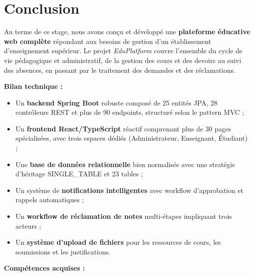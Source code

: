 \chapter*{Conclusion}

Au terme de ce stage, nous avons conçu et développé une \textbf{plateforme éducative web complète} répondant aux besoins de gestion d'un établissement d'enseignement supérieur. Le projet \textit{EduPlatform} couvre l'ensemble du cycle de vie pédagogique et administratif, de la gestion des cours et des devoirs au suivi des absences, en passant par le traitement des demandes et des réclamations.

\vspace{0.5cm}

\textbf{Bilan technique :}

\begin{itemize}[noitemsep]
    \item Un \textbf{backend Spring Boot} robuste composé de 25 entités JPA, 28 contrôleurs REST et plus de 90 endpoints, structuré selon le pattern MVC ;
    \item Un \textbf{frontend React/TypeScript} réactif comprenant plus de 30 pages spécialisées, avec trois espaces dédiés (Administrateur, Enseignant, Étudiant) ;
    \item Une \textbf{base de données relationnelle} bien normalisée avec une stratégie d'héritage SINGLE\_TABLE et 23 tables ;
    \item Un système de \textbf{notifications intelligentes} avec workflow d'approbation et rappels automatiques ;
    \item Un \textbf{workflow de réclamation de notes} multi-étapes impliquant trois acteurs ;
    \item Un \textbf{système d'upload de fichiers} pour les ressources de cours, les soumissions et les justifications.
\end{itemize}

\vspace{0.5cm}

\textbf{Compétences acquises :}


